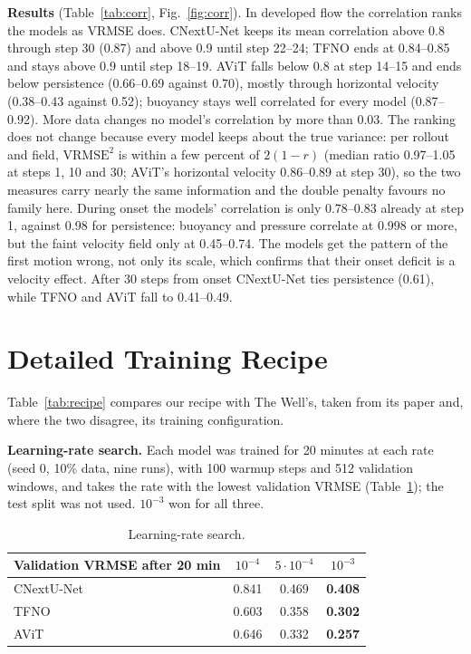 \documentclass[11pt]{article}
\begin{document}
\textbf{Results} (Table~\ref{tab:corr}, Fig.~\ref{fig:corr}). In developed flow the correlation ranks the models as
VRMSE does. CNextU-Net keeps its mean correlation above 0.8 through step 30 (0.87) and above 0.9 until step 22--24;
TFNO ends at 0.84--0.85 and stays above 0.9 until step 18--19. AViT falls below 0.8 at step 14--15 and ends below
persistence (0.66--0.69 against 0.70), mostly through horizontal velocity (0.38--0.43 against 0.52); buoyancy stays
well correlated for every model (0.87--0.92). More data changes no model's correlation by more than 0.03. The ranking
does not change because every model keeps about the true variance: per rollout and field, $\mathrm{VRMSE}^2$ is
within a few percent of $2(1-r)$ (median ratio 0.97--1.05 at steps 1, 10 and 30; AViT's horizontal velocity 0.86--0.89
at step 30), so the two measures carry nearly the same information and the double penalty favours no family here.
During onset the models' correlation is only 0.78--0.83 already at step 1, against 0.98 for persistence: buoyancy and
pressure correlate at 0.998 or more, but the faint velocity field only at 0.45--0.74. The models get the pattern of the
first motion wrong, not only its scale, which confirms that their onset deficit is a velocity effect. After 30 steps
from onset CNextU-Net ties persistence (0.61), while TFNO and AViT fall to 0.41--0.49.

\section{Detailed Training Recipe}
\label{app:recipe}

Table~\ref{tab:recipe} compares our recipe with The Well's, taken from its paper and, where the two disagree, its
training configuration.

\textbf{Learning-rate search.} Each model was trained for 20 minutes at each rate (seed 0, 10\% data, nine runs),
with 100 warmup steps and 512 validation windows, and takes the rate with the lowest validation VRMSE
(Table~\ref{tab:lr}); the test split was not used. $10^{-3}$ won for all three.

\begin{table}[!htbp]
\centering\small
\begin{tabular}{@{}lccc@{}}
\toprule
Validation VRMSE after 20 min & $10^{-4}$ & $5\cdot10^{-4}$ & $10^{-3}$ \\
\midrule
CNextU-Net & 0.841 & 0.469 & \textbf{0.408} \\
TFNO & 0.603 & 0.358 & \textbf{0.302} \\
AViT & 0.646 & 0.332 & \textbf{0.257} \\
\bottomrule
\end{tabular}
\caption{Learning-rate search.}
\label{tab:lr}
\end{table}
\end{document}
